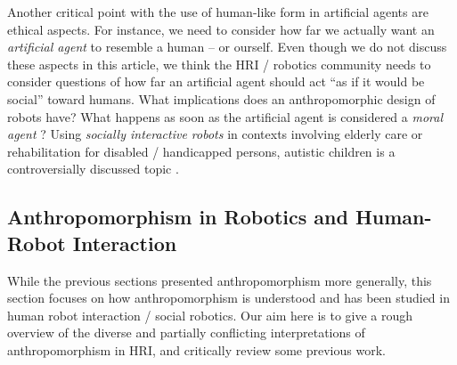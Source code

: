 \documentclass{frontiersSCNS} %
\begin{document}
Another critical point with the use of human-like form in artificial agents are ethical aspects. For instance, we need to consider how far we actually want an \textit{artificial agent} to resemble a human -- or ourself. Even though we do not discuss these aspects in this article, we think the HRI / robotics community needs to consider questions of how far an artificial agent should act ``as if it would be social'' toward humans. What implications does an anthropomorphic design of robots have? What happens as soon as the artificial agent is considered a \textit{moral agent} \cite{sullins_when_2006}? Using \textit{socially interactive robots} in contexts involving elderly care or rehabilitation for disabled / handicapped persons, autistic children is a controversially discussed topic \cite{robins_robots_2005}.






%
%
%
%
%
%

\subsection{Anthropomorphism in Robotics and Human-Robot Interaction}
\label{sec:anthropomorphism-robotics}

While the previous sections presented anthropomorphism more generally, this section focuses on how anthropomorphism is understood and has been studied in human robot interaction / social robotics. Our aim here is to give a rough overview of the diverse and partially conflicting interpretations of anthropomorphism in HRI, and critically review some previous work. 
\end{document}
